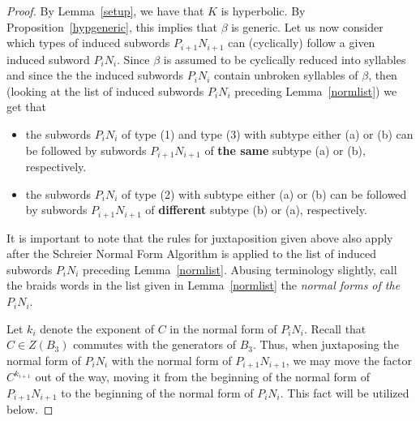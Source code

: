 \documentclass{article}
\begin{document}
\begin{proof} By Lemma~\ref{setup}, we have that $K$ is hyperbolic. By Proposition~\ref{hypgeneric}, this implies that $\beta$ is generic. Let us now consider which types of induced subwords $P_{i+1}N_{i+1}$ can (cyclically) follow a given induced subword $P_{i}N_{i}$. Since $\beta$ is assumed to be cyclically reduced into syllables and since the the induced subwords $P_{i}N_{i}$ contain unbroken syllables of $\beta$, then (looking at the list of induced subwords $P_{i}N_{i}$ preceding Lemma~\ref{normlist}) we get that
\begin{itemize}
	\item the subwords $P_{i}N_{i}$ of type (1) and type (3) with subtype either (a) or (b) can be followed by subwords $P_{i+1}N_{i+1}$ of \textbf{the same} subtype (a) or (b), respectively. 
\item the subwords $P_{i}N_{i}$ of type (2) with subtype either (a) or (b) can be followed by subwords $P_{i+1}N_{i+1}$ of \textbf{different} subtype (b) or (a), respectively. 
\end{itemize}

It is important to note that the rules for juxtaposition given above also apply after the Schreier Normal Form Algorithm is applied to the list of induced subwords $P_{i}N_{i}$ preceding Lemma~\ref{normlist}. Abusing terminology slightly, call the braids words in the list given in Lemma~\ref{normlist} the \emph{normal forms of the $P_{i}N_{i}$}. 

Let $k_{i}$ denote the exponent of $C$ in the normal form of $P_{i}N_{i}$. Recall that $C \in Z(B_{3})$ commutes with the generators of $B_{3}$. Thus, when juxtaposing the normal form of $P_{i}N_{i}$ with the normal form of $P_{i+1}N_{i+1}$, we may move the factor $C^{k_{i+1}}$ out of the way, moving it from the beginning of the normal form of $P_{i+1}N_{i+1}$ to the beginning of the normal form of $P_{i}N_{i}$. This fact will be utilized below. 


\end{proof}
\end{document}
